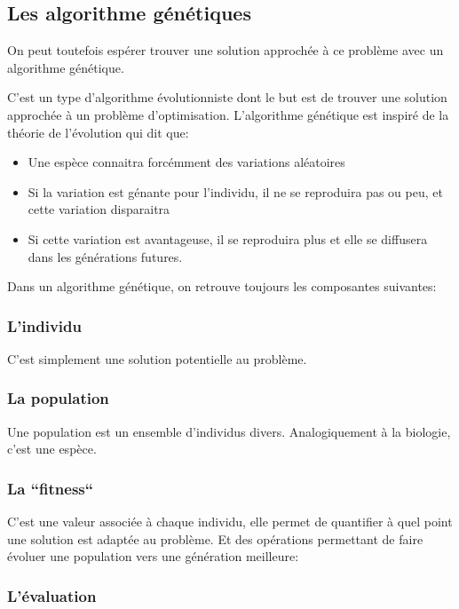\documentclass[11pt]{article}
\begin{document}
\subsection{Les algorithme génétiques}
\label{sec-1-2}

On peut toutefois espérer trouver une solution approchée à ce problème avec un algorithme génétique.

C'est un type d'algorithme évolutionniste dont le but est de trouver une solution approchée à un problème d'optimisation.
L'algorithme génétique est inspiré de la théorie de l'évolution qui dit que:
\begin{itemize}
\item Une espèce connaitra forcémment des variations aléatoires
\item Si la variation est génante pour l'individu, il ne se reproduira pas ou peu, et cette variation disparaitra
\item Si cette variation est avantageuse, il se reproduira plus et elle se diffusera dans les générations futures.
\end{itemize}

Dans un algorithme génétique, on retrouve toujours les composantes suivantes:

\subsubsection{L'individu}

C'est simplement une solution potentielle au problème.

\subsubsection{La population}

Une population est un ensemble d'individus divers. Analogiquement à la biologie, c'est une espèce.    

\subsubsection{La ``fitness``}

C'est une valeur associée à chaque individu, elle permet de quantifier à quel point
une solution est adaptée au problème.
Et des opérations permettant de faire évoluer une population vers une génération meilleure:

\subsubsection{L'évaluation}
\end{document}
